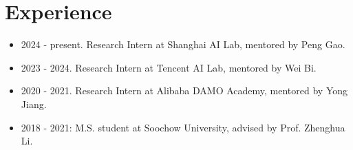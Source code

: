 \documentclass[a4paper,12pt]{article}
\begin{document}
\section{Experience}
\begin{itemize}[leftmargin=18pt]
\item 2024 - present. Research Intern at Shanghai AI Lab, mentored by Peng Gao.
\item 2023 - 2024. Research Intern at Tencent AI Lab, mentored by Wei Bi.
\item 2020 - 2021. Research Intern at Alibaba DAMO Academy, mentored by Yong Jiang.
\item 2018 - 2021: M.S. student at Soochow University, advised by Prof. Zhenghua Li.
\end{itemize}
\end{document}
